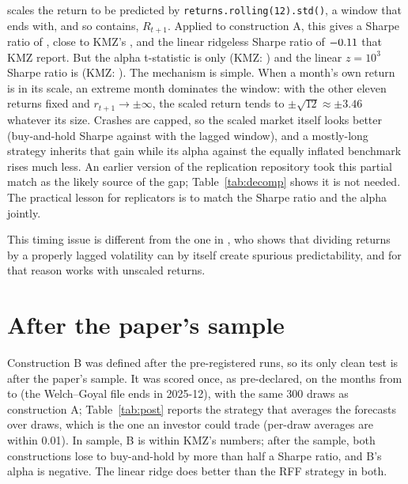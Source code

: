 \documentclass[11pt]{article}
\newcommand{\Rplus}{R_{t+1}}
\begin{document}
\citet{nkonts} scales the return to be predicted by \texttt{returns.rolling(12).std()}, a window that ends with,
and so contains, $\Rplus$. Applied to construction A, this gives a Sharpe ratio of \nLaSR, close to KMZ's
\nKmzSR, and the linear ridgeless Sharpe ratio of $-0.11$ that KMZ report. But the alpha t-statistic is only
\nLaT{} (KMZ: \nKmzT) and the linear $z = 10^3$ Sharpe ratio is \nLaLinSR{} (KMZ: \nKmzLinSR). The mechanism is
simple. When a month's own return is in its scale, an extreme month dominates the window: with the other eleven
returns fixed and $r_{t+1} \to \pm\infty$, the scaled return tends to $\pm\sqrt{12} \approx \pm 3.46$ whatever
its size. Crashes are capped, so the scaled market itself looks better (buy-and-hold Sharpe \nLaBH{} against
\nLagBH{} with the lagged window), and a mostly-long strategy inherits that gain while its alpha against the
equally inflated benchmark rises much less. An earlier version of the replication repository took this partial
match as the likely source of the gap; Table~\ref{tab:decomp} shows it is not needed. The practical lesson for
replicators is to match the Sharpe ratio and the alpha jointly.

This timing issue is different from the one in \citet[Appendix A]{nagel2025}, who shows that dividing returns
by a properly lagged volatility can by itself create spurious predictability, and for that reason works with
unscaled returns.

\section{After the paper's sample}

Construction B was defined after the pre-registered runs, so its only clean test is after the paper's
sample. It was scored once, as pre-declared, on the \nBPostN{} months from \nPostFirst{} to \nPostLast{} (the
Welch--Goyal file ends in 2025-12), with the same 300 draws as construction A; Table~\ref{tab:post} reports the
strategy that averages the forecasts over draws, which is the one an investor could trade (per-draw averages are
within 0.01). In sample, B is within KMZ's numbers; after the sample, both constructions lose to buy-and-hold by
more than half a Sharpe ratio, and B's alpha is negative. The linear ridge does better than the RFF strategy in both.
\end{document}

